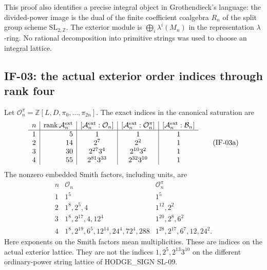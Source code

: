 \documentclass[11pt,a4paper]{article}
\theoremstyle{definition}
\theoremstyle{remark}
\begin{document}
This proof also identifies a precise integral object in Grothendieck's
language: the divided-power image is the dual of the finite coefficient
coalgebra $R_n$ of the split group scheme $\mathrm{SL}_{2,\mathbb Z}$.
The exterior module is $\bigoplus_i\lambda^i(M_n)$ in the representation
$\lambda$-ring. No rational decomposition into primitive strings was
used to choose an integral lattice.

\subsection{IF-03: the actual exterior order indices through rank four}
Let $\mathcal O_n^\pi=\mathbb Z[L,D,\pi_0,\ldots,\pi_{2n}]$.
The exact indices in the canonical saturation are
\[
\begin{array}{c|r|c|c|c}
 n&\operatorname{rank}\mathcal A_n^{\rm ext}
 &[\mathcal A_n^{\rm ext}:\mathcal O_n]
 &[\mathcal A_n^{\rm ext}:\mathcal O_n^\pi]
 &[\mathcal A_n^{\rm ext}:\mathcal B_n]\\\hline
 1&5&1&1&1\\
 2&14&2^7&2^2&1\\
 3&30&2^{27}3^4&2^{10}3^2&1\\
 4&55&2^{81}3^{33}&2^{32}3^{10}&1
\end{array} \tag{IF-03a}
\]
The nonzero embedded Smith factors, including units, are
\[
\begin{array}{c|l|l}
 n&\mathcal O_n&\mathcal O_n^\pi\\\hline
 1&1^5&1^5\\
 2&1^8,2^5,4&1^{12},2^2\\
 3&1^8,2^{17},4,12^4&1^{20},2^8,6^2\\
 4&1^8,2^{19},6^5,12^{14},24^4,72^4,288
   &1^{28},2^{17},6^7,12,24^2.
\end{array} \tag{IF-03b}
\]
Here exponents on the Smith factors mean multiplicities. These are
indices on the actual exterior lattice. They are not the indices
$1,2^5,2^{13}3^{10}$ on the different ordinary-power string lattice
of HODGE\_SIGN SL-09.
\end{document}
